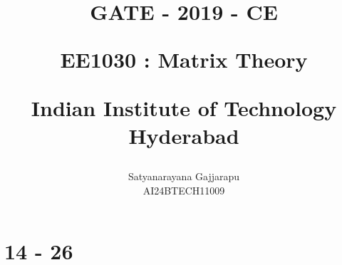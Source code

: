 \documentclass[journal]{IEEEtran}
\begin{document}

\vspace{3cm}




\title{
GATE - 2019 - CE

\large{EE1030 : Matrix Theory}

Indian Institute of Technology Hyderabad
}
\author{Satyanarayana Gajjarapu

AI24BTECH11009
}	





\maketitle




\bigskip

\renewcommand{\thefigure}{\theenumi}
\renewcommand{\thetable}{\theenumi}


\section{14 - 26}
\end{document}
